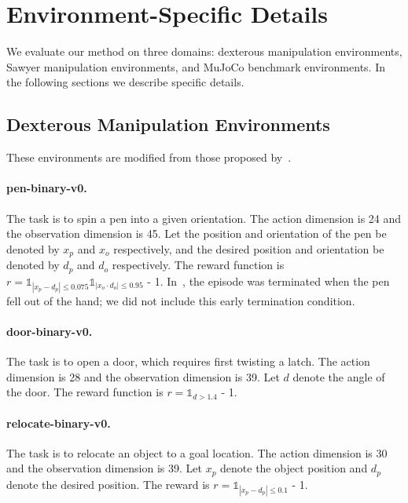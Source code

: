 \section{Environment-Specific Details} \label{sec:environment_impl}

We evaluate our method on three domains: dexterous manipulation environments, Sawyer manipulation environments, and MuJoCo benchmark environments. In the following sections we describe specific details.

\subsection{Dexterous Manipulation Environments}

These environments are modified from those proposed by~\citet{rajeswaran2018dextrous}.

\paragraph{pen-binary-v0.} The task is to spin a pen into a given orientation. The action dimension is 24 and the observation dimension is 45. Let the position and orientation of the pen be denoted by $x_p$ and $x_o$ respectively, and the desired position and orientation be denoted by $d_p$ and $d_o$ respectively. The reward function is $r = \mathds{1}_{|x_p - d_p| \leq 0.075} \mathds{1}_{|x_o \cdot d_o| \leq 0.95}$ - 1.
In~\citet{rajeswaran2018dextrous}, the episode was terminated when the pen fell out of the hand; we did not include this early termination condition.

\paragraph{door-binary-v0.} The task is to open a door, which requires first twisting a latch. The action dimension is 28 and the observation dimension is 39. Let $d$ denote the angle of the door. The reward function is $r = \mathds{1}_{d > 1.4}$ - 1.

\paragraph{relocate-binary-v0.} The task is to relocate an object to a goal location. The action dimension is 30 and the observation dimension is 39. Let $x_p$ denote the object position and $d_p$ denote the desired position. The reward is $r = \mathds{1}_{|x_p - d_p| \leq 0.1}$ - 1.

